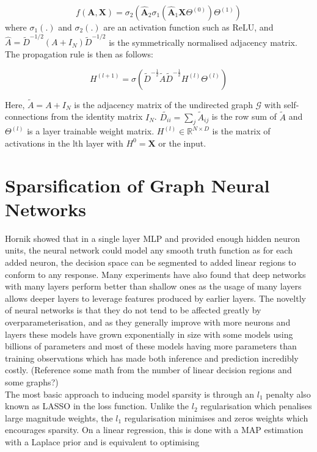 \documentclass[honours,12pt]{unswthesis}
\numberwithin{equation}{section}
\begin{document}
\begin{equation}
    f(\mathbf{A, X}) = \sigma_2( \mathbf{ \hat{A} }_2 \sigma_1 (\mathbf{ \hat{A} }_1 \mathbf{X} \Theta^{(0)}) \Theta^{(1)})
\end{equation}
where $\sigma_1(.)$ and $\sigma_2(.)$ are an activation function such as ReLU, and $\hat{A} = \tilde{D}^{-1/2} (A + I_N) \tilde{D}^{-1/2}$
is the symmetrically normalised adjacency matrix. The propagation rule is then as follows:

\begin{equation}
    H^{(l+1)} = \sigma(\tilde{D}^{-\frac{1}{2}} \tilde{A} \tilde{D}^{-\frac{1}{2}} H^{(l)} \Theta^{(l)})
\end{equation}

\noindent Here, $\tilde{A} = A + I_N$ is the adjacency matrix of the undirected graph $\mathcal{G}$ with self-connections from the identity matrix $I_N$.
$\tilde{D_{ii}} = \sum_{j} \tilde{A}_{ij} $ is the row sum of $\tilde{A}$ and $\Theta^{(l)}$ is a layer trainable weight matrix. 
$H^{(l)} \in \mathbb{R}^{N \times D}$ is the matrix of activations in the lth layer with $H^0 = \textbf{X}$ or the input. 


\section{Sparsification of Graph Neural Networks}\label{sparse-learning}

Hornik\cite{HORNIK1991251} showed that in a single layer MLP and provided enough hidden neuron units, 
the neural network could model any smooth truth function as for each added neuron, 
the decision space can be segmented to added linear regions to conform to any response. 
Many experiments have also found that deep networks with many layers perform better than shallow ones\cite{NIPS2014_109d2dd3}\cite{pmlr-v70-raghu17a}
as the usage of many layers allows deeper layers to leverage features produced by earlier layers.
The noveltly of neural networks is that they do not tend to be affected greatly by overparameterisation\cite{Cao_Gu_2020}, and as they generally improve with more neurons
and layers these models have grown exponentially in size with some models using billions of parameters and most of these models having more parameters than training observations
which has made both inference and prediction incredibly costly.  (Reference some math from the number of linear decision regions and some graphs?) \\

{\noindent}The most basic approach to inducing model sparsity is through an $l_1$ penalty also known as LASSO in the loss function.\cite{pml1Book}
Unlike the $l_2$ regularisation which penalises large magnitude weights, the $l_1$ regularisation minimises and zeros weights which encourages sparsity.
On a linear regression, this is done with a MAP estimation with a Laplace prior and is equivalent to optimising
\end{document}
